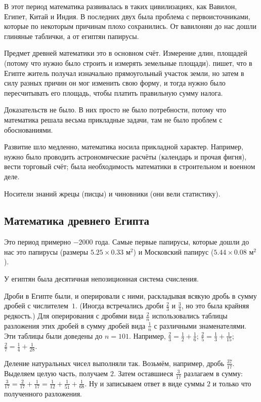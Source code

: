 \documentclass[a4paper,oneside,fleqn,10pt]{article}
\begin{document}
В этот период математика развивалась в таких цивилизациях, как
Вавилон, Египет, Китай и Индия. В последних двух была проблема с
первоисточниками, которые по некоторым причинам плохо сохранились.  От
вавилонян до нас дошли глиняные таблички, а от египтян папирусы.

Предмет древней математики это в основном счёт. Измерение длин,
площадей (потому что нужно было строить и измерять земельные
площади).  пишет, что в Египте житель получал изначально
прямоугольный участок земли, но затем в силу разных причин он мог
изменить свою форму, и тогда нужно было пересчитывать его площадь,
чтобы платить правильную сумму налога.

Доказательств не было. В них просто не было потребности, потому что
математика решала весьма прикладные задачи, там не было проблем с
обоснованиями.

Развитие шло медленно, математика носила прикладной характер.
Например, нужно было проводить астрономические расчёты (календарь и
прочая фигня), вести торговый счёт; была необходимость математики в
строительном и военном деле.

Носители знаний жрецы (писцы) и чиновники (они вели статистику).


\subsection{Математика древнего Египта}

Это период примерно $-2000$ года. Самые первые папирусы, которые дошли
до нас это папирусы  (размеры $5.25 \times 0.33$
м$^2$) и Московский папирус ($5.44 \times 0.08$ м$^2$).

У египтян была десятичная непозиционная система счисления.

Дроби в Египте были, и оперировали с ними, раскладывая всякую дробь в
сумму дробей с числителем~$1$.  (Иногда встречались дроби $\frac23$ и
$\frac34$, но это была крайняя редкость.)  Для оперирования с дробями
вида $\frac2n$ использовались таблицы разложения этих дробей в сумму
дробей вида $\frac1n$ с различными знаменателями. Эти таблицы были
доведены до $n = 101$. Например, $\frac23 = \frac12 + \frac16$;
$\frac25 = \frac13 + \frac1{15}$; $\frac27 = \frac14 + \frac1{28}$.

Деление натуральных чисел выполняли так. Возьмём, например, дробь
$\frac{37}{17}$.  Выделяем целую часть, получаем $2$. Затем оставшиеся
$\frac{3}{17}$ разлагаем в сумму: $\frac{3}{17} = \frac2{17} +
\frac1{17} = \frac1{12} + \frac1{51} + \frac1{68}$.  Ну и записываем
ответ в виде суммы $2$ и только что полученного разложения.
\end{document}
